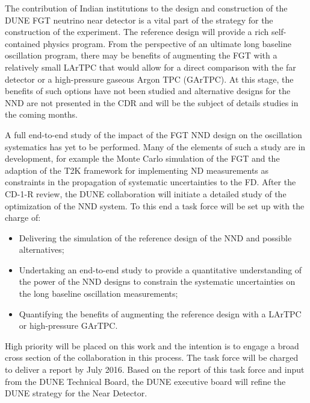 The contribution of Indian institutions to the design and construction
of the DUNE FGT neutrino near detector is a vital part of the strategy
for the construction of the experiment. The reference design will
provide a rich self-contained physics program. From the perspective of
an ultimate long baseline oscillation program, there may be benefits
of augmenting the FGT with a relatively small LArTPC that would allow
for a direct comparison with the far detector or a high-pressure
gaseous Argon TPC (GArTPC). At this stage, the benefits of such options have
not been studied and alternative designs for the NND are not presented
in the CDR and will be the subject of details studies in the coming
months.

A full end-to-end study of the impact of the FGT NND design on the
oscillation systematics has yet to be performed. Many of the elements
of such a study are in development, for example the Monte Carlo
simulation of the FGT and the adaption of the T2K framework for
implementing ND measurements as constraints in the propagation of
systematic uncertainties to the FD.  After the CD-1-R review, the DUNE
collaboration will initiate a detailed study of the optimization of
the NND system. To this end a task force will be set up with the
charge of:
\begin{itemize}
\item Delivering the simulation of the reference design of the NND and
  possible alternatives;
\item Undertaking an end-to-end study to provide a quantitative
  understanding of the power of the NND designs to constrain the
  systematic uncertainties on the long baseline oscillation measurements;
\item Quantifying the benefits of augmenting the reference design with
  a LArTPC or high-pressure GArTPC.
\end{itemize}
High priority will be placed on this work and the intention is to engage a broad 
cross section of the collaboration in this process. The task force will be charged 
to deliver a report by July 2016. Based on the report of this task force and input 
from the DUNE Technical Board, the DUNE executive board will refine the DUNE strategy 
for the Near Detector.
